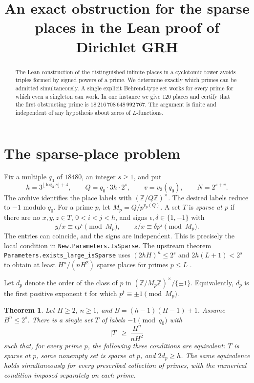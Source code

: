 \documentclass[11pt]{article}
\title{An exact obstruction for the sparse places in the Lean proof of Dirichlet GRH}
\author{}
\date{}
\newtheorem{theorem}{Theorem}
\newcommand{\Z}{\mathbb Z}
\begin{document}
\maketitle
\vspace{-2em}
\begin{abstract}
The Lean construction of the distinguished infinite places in a cyclotomic
tower avoids triples formed by signed powers of a prime. We determine exactly
which primes can be admitted simultaneously. A single explicit Behrend-type
set works for every prime for which even a singleton can work. In one instance
we give 120 places and certify that the first obstructing prime is
$18\,216\,708\,648\,992\,767$. The argument is finite and independent of any
hypothesis about zeros of $L$-functions.
\end{abstract}

\section{The sparse-place problem}

Fix a multiple $q_0$ of $18480$, an integer $s\ge1$, and put
\[
h=3^{\lfloor\log_3 s\rfloor+4},\qquad
Q=q_0\cdot3h\cdot2^s,\qquad v=v_2(q_0),\qquad N=2^{s+v}.
\]
The archive identifies the place labels with $(\Z/Q\Z)^\times$. The desired
labels reduce to $-1$ modulo $q_0$. For a prime $p$, let $M_p=Q/p^{v_p(Q)}$.
A set $T$ is \emph{sparse at $p$} if there are no
$x,y,z\in T$, $0<i<j<h$, and signs $\epsilon,\delta\in\{1,-1\}$ with
\[
y/x\equiv \epsilon p^i\pmod{M_p},\qquad
z/x\equiv \delta p^j\pmod{M_p}.
\]
The entries can coincide, and the signs are independent. This is precisely
the local condition in \texttt{New.Parameters.IsSparse}. The upstream theorem
\texttt{Parameters.exists\_large\_isSparse} uses
$(2hH)^n\le2^s$ and $2h(L+1)<2^s$ to obtain at least
$H^n/(nH^2)$ sparse places for primes $p\le L$
\cite{definition,construction}.

Let $d_p$ denote the order of the class of $p$ in
$(\Z/M_p\Z)^\times/\{\pm1\}$. Equivalently, $d_p$ is the first positive
exponent $t$ for which $p^t\equiv\pm1\pmod{M_p}$.

\begin{theorem}\label{thm}
Let $H\ge2$, $n\ge1$, and $B=(h-1)(H-1)+1$. Assume $B^n\le2^s$.
There is a single set $T$ of labels $-1\pmod{q_0}$ with
\[
|T|\ \ge\ \frac{H^n}{nH^2}
\]
such that, for every prime $p$, the following three conditions are equivalent:
$T$ is sparse at $p$, some nonempty set is sparse at $p$, and $2d_p\ge h$.
The same equivalence holds simultaneously for every prescribed collection of
primes, with the numerical condition imposed separately on each prime.
\end{theorem}
\end{document}

